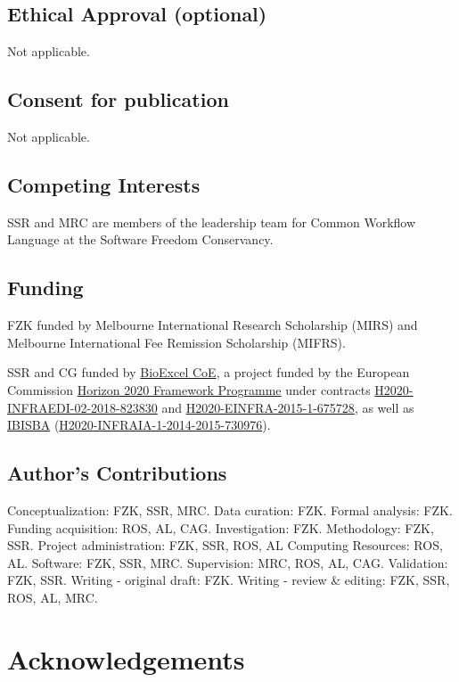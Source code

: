 \documentclass[a4paper,num-refs]{oup-contemporary}
\begin{document}
\subsection{Ethical Approval (optional)}
Not applicable.

\subsection{Consent for publication}

Not applicable.

\subsection{Competing Interests}

SSR and MRC are members of the leadership team for Common Workflow Language at the Software Freedom Conservancy.

\subsection{Funding}

FZK funded by Melbourne International Research Scholarship (MIRS) and Melbourne International Fee Remission Scholarship (MIFRS).

SSR and CG funded by \href{https://www.bioexcel.eu}{BioExcel CoE}, a project funded by the European Commission
\href{http://dx.doi.org/10.13039/100010666}{Horizon 2020 Framework Programme} under 
contracts \href{https://cordis.europa.eu/project/id/823830}{H2020-INFRAEDI-02-2018-823830} and
\href{http://cordis.europa.eu/projects/675728}{H2020-EINFRA-2015-1-675728}, as well as \href{https://www.ibisba.eu/}{IBISBA} (\href{http://cordis.europa.eu/projects/730976}{H2020-INFRAIA-1-2014-2015-730976}).


\subsection{Author's Contributions}
Conceptualization: FZK, SSR, MRC.
Data curation: FZK.
Formal analysis: FZK.
Funding acquisition: ROS, AL, CAG.
Investigation: FZK.
Methodology: FZK, SSR.
Project administration: FZK, SSR, ROS, AL 
Computing Resources: ROS, AL.
Software: FZK, SSR, MRC.
Supervision: MRC, ROS, AL, CAG.
Validation: FZK, SSR.
Writing - original draft: FZK.
Writing - review \& editing: FZK, SSR, ROS, AL, MRC. 

\section{Acknowledgements}
\end{document}
